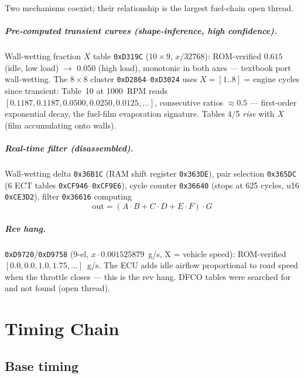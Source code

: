 \documentclass[11pt,a4paper]{book}
\begin{document}
Two mechanisms coexist; their relationship is the largest fuel-chain
open thread.

\paragraph{Pre-computed transient curves (shape-inference, high confidence).}
Wall-wetting fraction $X$ table \texttt{0xD319C} ($10\times9$, $x/32768$):
ROM-verified $0.615$ (idle, low load) $\rightarrow$ $0.050$ (high load),
monotonic in both axes --- textbook port wall-wetting.
The $8\times8$ cluster \texttt{0xD2864}--\texttt{0xD3024} uses
$X = [1..8]$ = engine cycles since transient: Table~10 at 1000~RPM reads
$[0.1187, 0.1187, 0.0500, 0.0250, 0.0125, \ldots]$, consecutive ratios
$\approx 0.5$ --- first-order exponential decay, the fuel-film evaporation
signature. Tables 4/5 \emph{rise} with $X$ (film accumulating onto walls).

\paragraph{Real-time filter (disassembled).}
Wall-wetting delta \texttt{0x36B1C} (RAM shift register \texttt{0x363DE}),
pair selection \texttt{0x365DC} (6 ECT tables \texttt{0xCF946}--\texttt{0xCF9E6}),
cycle counter \texttt{0x36640} (stops at 625 cycles, u16 \texttt{0xCE3D2}),
filter \texttt{0x36616} computing
\begin{equation}
  \mathrm{out} = (A \cdot B + C \cdot D + E \cdot F) \cdot G
\end{equation}

\paragraph{Rev hang.}
\texttt{0xD9720}/\texttt{0xD9758} (9-el, $x \cdot 0.001525879$~g/s,
X = vehicle speed): ROM-verified $[0.0, 0.0, 1.0, 1.75, \ldots]$~g/s.
The ECU adds idle airflow proportional to road speed when the throttle
closes --- this is the rev hang. DFCO tables were searched for and not
found (open thread).

\chapter{Timing Chain}

\section{Base timing}
\end{document}
